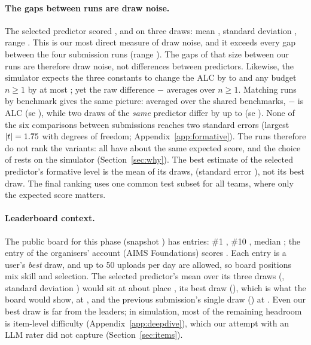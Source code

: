 \documentclass{article}
\begin{document}
\paragraph{The gaps between runs are draw noise.} The selected predictor scored \SdDrawOneAlc, \SdDrawTwoAlc{} and \SdDrawThreeAlc{} on three draws: mean \SdAlcMean, standard deviation \SdAlcSd, range \SdAlcRange. This is our most direct measure of draw noise, and it exceeds every gap between the four submission runs (range \FmAlcRange). The gaps of that size between our runs are therefore draw noise, not differences between predictors. Likewise, the simulator expects the three constants to change the ALC by \DdSelGainBest{} to \DdSelCostMax{} and any budget $n\ge1$ by at most \DdSelMaxDeltaLater; yet the raw difference \SelId{} $-$ \FmShipId{} averages \FmSelMinusShipLaterMean{} over $n\ge1$. Matching runs by benchmark gives the same picture: averaged over the \FmMatchSelShipN{} shared benchmarks, \SelId{} $-$ \FmShipId{} is \FmMatchSelShipAlcMean{} ALC (se \FmMatchSelShipAlcSe), while two draws of the \emph{same} predictor differ by up to \SdMatchThreeOneMean{} (se \SdMatchThreeOneSe). None of the six comparisons between submissions reaches two standard errors (largest $|t|=1.75$ with \FmMatchDf{} degrees of freedom; Appendix~\ref{app:formative}). The runs therefore do not rank the variants: all have about the same expected score, and the choice of \SelId{} rests on the simulator (Section~\ref{sec:why}). The best estimate of the selected predictor's formative level is the mean of its draws, \SdAlcMean{} (standard error \SdAlcSe), not its best draw. The final ranking uses one common test subset for all teams, where only the expected score matters.

\paragraph{Leaderboard context.} The public board for this phase (snapshot \LbDate) has \LbN{} entries: \#1 \LbFirst, \#10 \LbTenth, median \LbMedian; the entry of the organisers' account (AIMS Foundations) scores \LbAims. Each entry is a user's \emph{best} draw, and up to 50 uploads per day are allowed, so board positions mix skill and selection. The selected predictor's mean over its three draws (\SdAlcMean, standard deviation \SdAlcSd) would sit at about place \LbRankSelMean, its best draw (\FmSelAlc), which is what the board would show, at \LbRankSel, and the previous submission's single draw (\FmShipAlc) at \LbRankShip. Even our best draw is far from the leaders; in simulation, most of the remaining headroom is item-level difficulty (Appendix~\ref{app:deepdive}), which our attempt with an LLM rater did not capture (Section~\ref{sec:items}).
\end{document}
